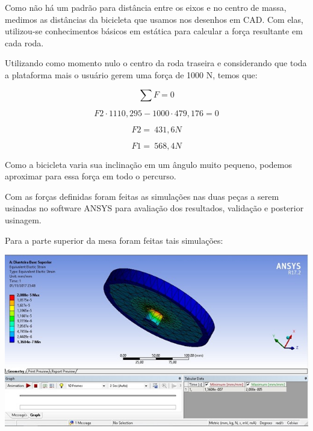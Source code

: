     Como não há um padrão para distância entre os eixos e no centro de massa, medimos as distâncias da bicicleta que usamos nos desenhos em CAD. Com elas, utilizou-se conhecimentos básicos em estática para calcular a força resultante em cada roda. 

    Utilizando como momento nulo o centro da roda traseira e considerando que toda a plataforma mais o usuário gerem uma força de 1000 N, temos que:

\begin{equation}\label{eq290}
	\sum F = 0 
\end{equation}

 \begin{equation}\label{eq291}
	F2 \cdot 1110,295 - 1000 \cdot 479,176 = 0 
\end{equation}

 \begin{equation}\label{eq292}
	F2 = ~431,6 N
\end{equation}

 \begin{equation}\label{eq293}
	F1 =~ 568,4 N
\end{equation}

    Como a bicicleta varia sua inclinação em um ângulo muito pequeno, podemos aproximar para essa força em todo o percurso.

    Com as forças definidas foram feitas as simulações nas duas peças a serem usinadas no software ANSYS para avaliação dos resultados, validação e posterior usinagem.

    Para a parte superior da mesa foram feitas tais simulações:

     \begin{center}
    	\includegraphics[scale=0.7]{figuras/sim_estatica_1}
        \label{sim_estatica_1}
    \end{center}

